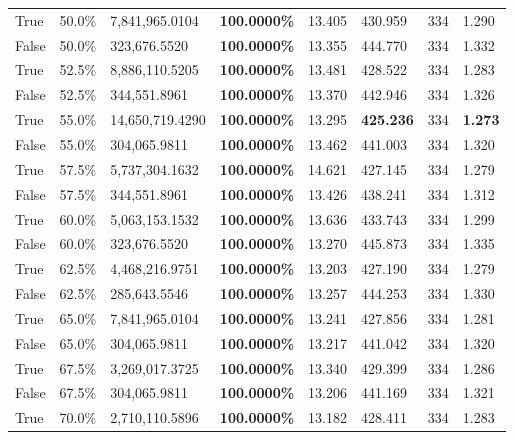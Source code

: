 \begin{table}[H]
\begin{tabular}{lllrllll}
\cline{1-8}
True & 50.0\% & 7,841,965.0104 & \bfseries \color{red} 100.0000\% & 13.405 & 430.959 & 334 & 1.290 \\
\cline{1-8}
False & 50.0\% & 323,676.5520 & \bfseries \color{red} 100.0000\% & 13.355 & 444.770 & 334 & 1.332 \\
\cline{1-8}
True & 52.5\% & 8,886,110.5205 & \bfseries \color{red} 100.0000\% & 13.481 & 428.522 & 334 & 1.283 \\
\cline{1-8}
False & 52.5\% & 344,551.8961 & \bfseries \color{red} 100.0000\% & 13.370 & 442.946 & 334 & 1.326 \\
\cline{1-8}
True & 55.0\% & 14,650,719.4290 & \bfseries \color{red} 100.0000\% & 13.295 & \bfseries \color{red} 425.236 & 334 & \bfseries \color{red} 1.273 \\
\cline{1-8}
False & 55.0\% & 304,065.9811 & \bfseries \color{red} 100.0000\% & 13.462 & 441.003 & 334 & 1.320 \\
\cline{1-8}
True & 57.5\% & 5,737,304.1632 & \bfseries \color{red} 100.0000\% & 14.621 & 427.145 & 334 & 1.279 \\
\cline{1-8}
False & 57.5\% & 344,551.8961 & \bfseries \color{red} 100.0000\% & 13.426 & 438.241 & 334 & 1.312 \\
\cline{1-8}
True & 60.0\% & 5,063,153.1532 & \bfseries \color{red} 100.0000\% & 13.636 & 433.743 & 334 & 1.299 \\
\cline{1-8}
False & 60.0\% & 323,676.5520 & \bfseries \color{red} 100.0000\% & 13.270 & 445.873 & 334 & 1.335 \\
\cline{1-8}
True & 62.5\% & 4,468,216.9751 & \bfseries \color{red} 100.0000\% & 13.203 & 427.190 & 334 & 1.279 \\
\cline{1-8}
False & 62.5\% & \color{red} 285,643.5546 & \bfseries \color{red} 100.0000\% & 13.257 & 444.253 & 334 & 1.330 \\
\cline{1-8}
True & 65.0\% & 7,841,965.0104 & \bfseries \color{red} 100.0000\% & 13.241 & 427.856 & 334 & 1.281 \\
\cline{1-8}
False & 65.0\% & 304,065.9811 & \bfseries \color{red} 100.0000\% & 13.217 & 441.042 & 334 & 1.320 \\
\cline{1-8}
True & 67.5\% & 3,269,017.3725 & \bfseries \color{red} 100.0000\% & 13.340 & 429.399 & 334 & 1.286 \\
\cline{1-8}
False & 67.5\% & 304,065.9811 & \bfseries \color{red} 100.0000\% & 13.206 & 441.169 & 334 & 1.321 \\
\cline{1-8}
True & 70.0\% & 2,710,110.5896 & \bfseries \color{red} 100.0000\% & 13.182 & 428.411 & 334 & 1.283 \\

\end{tabular}
\end{table}
